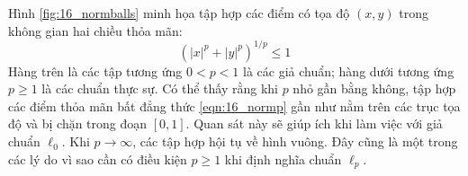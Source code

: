 Hình \ref{fig:16_normballs} minh họa tập hợp các điểm có tọa độ $(x, y)$ trong không gian hai chiều thỏa mãn: 
\begin{equation} 
\label{eqn:16_normp}
(|x|^p + |y|^p)^{1/p} \leq 1 
\end{equation} 
Hàng trên là các tập tương ứng $0 < p < 1$ là các giả chuẩn; hàng dưới tương
ứng $p \geq 1$ là các chuẩn thực sự. Có thể thấy rằng khi $p$ nhỏ
gần bằng không, tập hợp các điểm thỏa mãn bất đẳng thức \eqref{eqn:16_normp} gần như
nằm trên các trục tọa độ và bị chặn trong đoạn $[0, 1]$. Quan sát này sẽ giúp
ích khi làm việc với giả chuẩn $\ell_0$. Khi $p \rightarrow
\infty$, các tập hợp hội tụ về hình vuông.
Đây cũng là một trong các lý do vì sao cần có điều kiện $p \geq 1$ khi định
nghĩa chuẩn $\ell_p$. 
 


 
 
 
